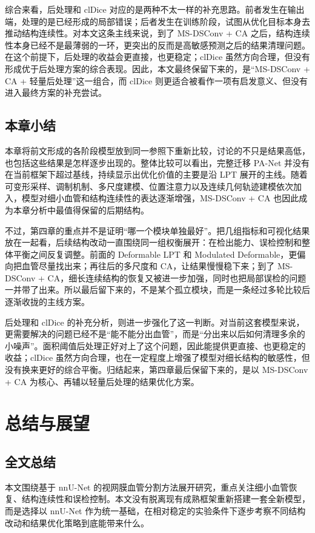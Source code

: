 \documentclass[a4paper,12pt]{article}
\begin{document}
综合来看，后处理和 clDice 对应的是两种不太一样的补充思路。前者发生在输出端，处理的是已经形成的局部错误；后者发生在训练阶段，试图从优化目标本身去推动结构连续性。对本文这条主线来说，到了 MS-DSConv + CA 之后，结构连续性本身已经不是最薄弱的一环，更突出的反而是高敏感预测之后的结果清理问题。在这个前提下，后处理的收益会更直接，也更稳定；clDice 虽然方向合理，但没有形成优于后处理方案的综合表现。因此，本文最终保留下来的，是“MS-DSConv + CA + 轻量后处理”这一组合，而 clDice 则更适合被看作一项有启发意义、但没有进入最终方案的补充尝试。

\subsection{本章小结}

本章将前文形成的各阶段模型放到同一参照下重新比较，讨论的不只是结果高低，也包括这些结果是怎样逐步出现的。整体比较可以看出，完整迁移 PA-Net 并没有在当前框架下超过基线，持续显示出优化价值的主要是沿 LPT 展开的主线。随着可变形采样、调制机制、多尺度建模、位置注意力以及连续几何轨迹建模依次加入，模型对细小血管和结构连续性的表达逐渐增强，MS-DSConv + CA 也因此成为本章分析中最值得保留的后期结构。

不过，第四章的重点并不是证明“哪一个模块单独最好”。把几组指标和可视化结果放在一起看，后续结构改动一直围绕同一组权衡展开：在检出能力、误检控制和整体平衡之间反复调整。前面的 Deformable LPT 和 Modulated Deformable，更偏向把血管尽量找出来；再往后的多尺度和 CA，让结果慢慢稳下来；到了 MS-DSConv + CA，细长连续结构的恢复又被进一步加强，同时也把局部误检的问题一并带了出来。所以最后留下来的，不是某个孤立模块，而是一条经过多轮比较后逐渐收拢的主线方案。

后处理和 clDice 的补充分析，则进一步强化了这一判断。对当前这套模型来说，更需要解决的问题已经不是“能不能分出血管”，而是“分出来以后如何清理多余的小噪声”。面积阈值后处理正好对上了这个问题，因此能提供更直接、也更稳定的收益；clDice 虽然方向合理，也在一定程度上增强了模型对细长结构的敏感性，但没有换来更好的综合平衡。归结起来，第四章最后保留下来的，是以 MS-DSConv + CA 为核心、再辅以轻量后处理的结果优化方案。

\section{总结与展望}

\subsection{全文总结}
本文围绕基于 nnU-Net 的视网膜血管分割方法展开研究，重点关注细小血管恢复、结构连续性和误检控制。本文没有脱离现有成熟框架重新搭建一套全新模型，而是选择以 nnU-Net 作为统一基础，在相对稳定的实验条件下逐步考察不同结构改动和结果优化策略到底能带来什么。
\end{document}
